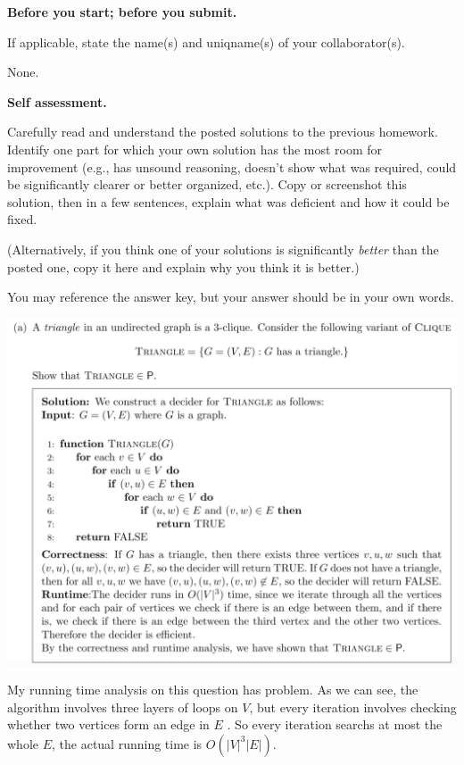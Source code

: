 \documentclass[11pt,addpoints,answers]{exam}
\begin{document}
\hwpreface

\pointsinmargin
{}
\marginpointname{ \points}
\marginbonuspointname{ \bonuspoints}

\begin{questions}
    \addtocounter{question}{-1}
    
    \question[0] \textbf{Before you start; before you submit.}
    
    If applicable, state the name(s) and uniqname(s) of your collaborator(s).
    
    \begin{solution}
    None.
    \end{solution}
    
    \question[10] \textbf{Self assessment.}
    
    Carefully read and understand the posted solutions to the previous homework. Identify one part for which your own solution has the most room for improvement (e.g., has unsound reasoning, doesn’t show what was required, could be significantly clearer or better organized, etc.). Copy or screenshot this solution, then in a few sentences, explain what was deficient and how it could be fixed.
    
    (Alternatively, if you think one of your solutions is significantly \emph{better} than the posted one, copy it here and explain why you think it is better.)
    
    You may reference the answer key, but your answer should be in your own words.
    
    \begin{solution}
    \begin{center}
      \includegraphics[scale=0.35]{1.png}\\
    \end{center}
    My running time analysis on this question has problem. As we can see, the algorithm involves three layers of loops on $V$, but every iteration involves checking whether two vertices form an edge in $E$ . So every iteration searchs at most the whole $E$, the actual running time is $O(|V|^3|E|)$.
    \end{solution}


\end{questions}
\end{document}

